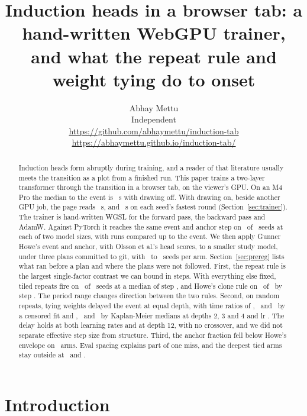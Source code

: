 \documentclass[10pt]{article}
\title{\vspace*{-2.5em}Induction heads in a browser tab: a hand-written WebGPU trainer, and what the repeat rule and weight tying do to onset}
\author{Abhay Mettu\\Independent\\[2pt]\small\url{https://github.com/abhaymettu/induction-tab}\\\small\url{https://abhaymettu.github.io/induction-tab/}}
\date{\vspace{-1.5em}}
\begin{document}
\maketitle

\begin{abstract}
Induction heads form abruptly during training, and a reader of that literature usually meets the transition as a plot from a finished run. This paper trains a two-layer transformer through the transition in a browser tab, on the viewer's GPU. On an M4 Pro the median to the event is \nBenchMedianSeconds\ s with drawing off. With drawing on, beside another GPU job, the page reads \nWatchedMedian\ s, and \nWatchedLeast\ s on each seed's fastest round (Section~\ref{sec:trainer}). The trainer is hand-written WGSL for the forward pass, the backward pass and AdamW. Against PyTorch it reaches the same event and anchor step on \nWholeTabSeeds\ of \nWholeTabSeeds\ seeds at each of two model sizes, with runs compared up to the event. We then apply Gunner Howe's event and anchor, with Olsson et al.'s head scores, to a smaller study model, under three plans committed to git, with \nNEightOneHi\ to \nNTwoTwoHi\ seeds per arm. Section~\ref{sec:prereg} lists what ran before a plan and where the plans were not followed. First, the repeat rule is the largest single-factor contrast we can bound in steps. With everything else fixed, tiled repeats fire on \nRuleBiTiledEv\ of \nRuleBiCloneN\ seeds at a median of step \nRuleBiTiledMed, and Howe's clone rule on \nRuleBiCloneEv\ of \nRuleBiCloneN\ by step \nCrossedBudget. The period range changes direction between the two rules. Second, on random repeats, tying weights delayed the event at equal depth, with time ratios of \nFitTwoOneVsTwoTwoHi, \nFitThreeOneVsThreeThreeHi\ and \nFitFourOneVsFourFourHi\ by a censored fit and \nKmTwoOneVsTwoTwoHi, \nKmThreeOneVsThreeThreeHi\ and \nKmFourOneVsFourFourHi\ by Kaplan-Meier medians at depths 2, 3 and 4 and lr \nLrHi. The delay holds at both learning rates and at depth 12, with no crossover, and we did not separate effective step size from structure. Third, the anchor fraction fell below Howe's envelope on \nArmsOutside\ arms. Eval spacing explains part of one miss, and the deepest tied arms stay outside at \nGapTwelveFourHi\ and \nGapEightOneHi.
\end{abstract}

\section{Introduction}
\label{sec:intro}
\end{document}
